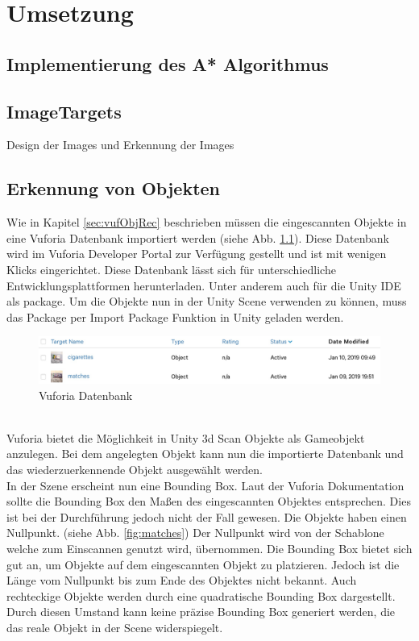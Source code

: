 \chapter{Umsetzung}
\label{sec:Umsetzung}
\section{Implementierung des A* Algorithmus}
\label{sec:implementAStar}
\section{ImageTargets}
Design der Images und Erkennung der Images
\section{Erkennung von Objekten}
Wie in Kapitel \ref{sec:vufObjRec} beschrieben müssen die eingescannten Objekte in eine Vuforia Datenbank importiert werden (siehe Abb. \ref{fig:vuforiaObjectDatabase}). Diese Datenbank wird im Vuforia Developer Portal zur Verfügung gestellt und ist mit wenigen Klicks eingerichtet. Diese Datenbank lässt sich für unterschiedliche Entwicklungsplattformen herunterladen. Unter anderem auch für die Unity IDE als package. Um die Objekte nun in der Unity Scene verwenden zu können, muss das Package per Import Package Funktion in Unity geladen werden.
\begin{figure}[h]
    \centering
    \includegraphics[width=\textwidth]{assets/vuforiaDataBase.jpeg}
    \caption{Vuforia Datenbank}\label{fig:vuforiaObjectDatabase}
\end{figure}\\
Vuforia bietet die Möglichkeit in Unity 3d Scan Objekte als Gameobjekt anzulegen. Bei dem angelegten Objekt kann nun die importierte Datenbank und das wiederzuerkennende Objekt ausgewählt werden. \\
In der Szene erscheint nun eine Bounding Box. Laut der Vuforia Dokumentation\cite{VufObjRec}  sollte die Bounding Box den Maßen des eingescannten Objektes entsprechen. Dies ist bei der Durchführung jedoch nicht der Fall gewesen. Die Objekte haben einen Nullpunkt. (siehe Abb. \ref{fig:matches}) Der Nullpunkt wird von der Schablone welche zum Einscannen genutzt wird, übernommen. Die Bounding Box bietet sich gut an, um Objekte auf dem eingescannten Objekt zu platzieren. Jedoch ist die Länge vom Nullpunkt bis zum Ende des Objektes nicht bekannt. Auch rechteckige Objekte werden durch eine quadratische Bounding Box dargestellt. Durch diesen Umstand kann keine präzise Bounding Box generiert werden, die das reale Objekt in der Scene widerspiegelt.\\

